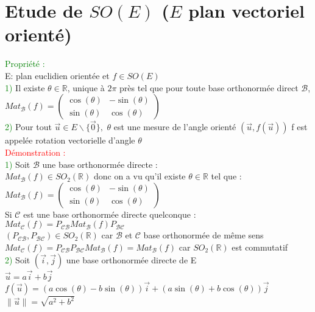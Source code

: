 \documentclass{article}
\begin{document}
\section{Etude de $SO(E)$ ($E$ plan vectoriel orienté)}
\textcolor{green}{Propriété :} \\
E: plan euclidien orientée et $f \in SO(E)$ \\
\textcolor{green}{1)} Il existe $\theta \in \mathbb R$, unique à $2\pi$ près tel que pour toute base orthonormée direct $\mathcal B$, $Mat_{\mathcal B}(f) = \begin{pmatrix}
\cos(\theta) & -\sin(\theta) \\
\sin(\theta) & \cos(\theta)
\end{pmatrix}$ \\
\textcolor{green}{2)} Pour tout $\vec u \in E \backslash \lbrace \vec 0 \rbrace, $ $\theta$ est une mesure de l'angle orienté $(\vec u, f(\vec u))$ f est appelée rotation vectorielle d'angle $\theta$ \\
\textcolor{red}{Démonstration :} \\
\textcolor{green}{1)} Soit $\mathcal B$ une base orthonormée directe : \\
$Mat_{\mathcal B}(f) \in SO_2(\mathbb R)$ donc on a vu qu'il existe $\theta \in \mathbb R$ tel que : \\
$Mat_{\mathcal B}(f)= \begin{pmatrix}
\cos(\theta) & - \sin(\theta) \\
\sin(\theta) & \cos(\theta)
\end{pmatrix}$ \\
Si $\mathcal C$ est une base orthonormée directe quelconque : \\
$Mat_{\mathcal C}(f)=P_{\mathcal{CB}} Mat_{\mathcal B}(f) P_{\mathcal{BC}}$ \\
$(P_{\mathcal{CB}},P_{\mathcal{BC}}) \in SO_2(\mathbb R)$ car $\mathcal B$ et $\mathcal C$ base orthonormée de même sens \\
$Mat_{\mathcal C}(f)=P_{\mathcal{CB}} P_{\mathcal{BC}} Mat_{\mathcal B}(f)=Mat_{\mathcal B}(f)$ car $SO_2(\mathbb R)$ est commutatif \\
\textcolor{green}{2)} Soit $(\vec i,\vec j)$ une base orthonormée directe de E \\
$\vec u=a \vec i + b\vec j$ \\
$f(\vec u)=(a\cos(\theta)-b \sin(\theta))\vec i + (a\sin(\theta)+b\cos(\theta))\vec j$ \\
$\| \vec u \| = \sqrt{a^2+b^2}$ \\
\end{document}
